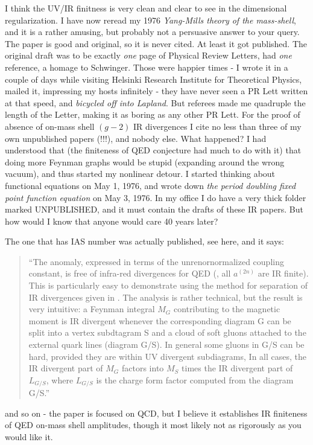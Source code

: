 \begin{description}
I think the UV/IR finitness is very clean and clear to see in the
dimensional regularization.
I have now reread my 1976 {\em {Yang-Mills} theory of the
mass-shell}, and it is a rather amusing, but probably not a
persuasive answer to your query. The paper is good and original, so it is
never cited. At least it got published. The original draft was to be
exactly \emph{one} page of Physical Review Letters, {had} \emph{one}
reference, a homage to Schwinger. Those were happier
times - I wrote it in a couple of days while visiting Helsinki Research
Institute for Theoretical Physics, mailed it, impressing my hosts
infinitely - they have never seen a PR Lett written at that speed, and
{\em bicycled off into Lapland}. But referees made me quadruple the
length of the Letter, making it as boring as any other PR Lett. For the
proof of absence of on-mass shell $(g-2)$ IR divergences I cite no less
than three of my own unpublished papers (!!!), and nobody else.
What
happened? I had understood that (the finiteness of QED
conjecture had much to do with it) that doing more Feynman graphs would
be stupid (expanding around the wrong vacuum), and thus started my
nonlinear detour. I started thinking about functional equations on May 1,
1976, and wrote down
{\em the period doubling fixed point function equation} on May 3, 1976.
In my office I do have a very thick folder marked UNPUBLISHED, and it
must contain the drafts of these IR papers. But how would I know that
anyone would care 40 years later?

The one that has IAS number was actually published, see
{here}, and it says:
\begin{quote}
``The anomaly, expressed in terms of the unrenornormalized coupling
constant, is free of infra-red divergences for QED (\ie, all $a^{(2n)}$
are IR finite). This is particularly easy to demonstrate using the method
for separation of IR divergences given in . The
analysis is rather technical, but the result is very intuitive: a Feynman
integral $M_G$ contributing to the magnetic moment is IR divergent
whenever the corresponding diagram G can be split into a vertex
subdtagram S and a cloud of soft gluons attached to the external quark
lines (diagram G/S). In general some gluons in G/S can be hard, provided
they are within UV divergent subdiagrams, In all cases, the IR divergent
part of $M_G$ factors into $M_S$ times the IR divergent part of
$L_{G/S}$, where $L_{G/S}$ is the charge form factor computed from the
diagram G/S.''
\end{quote}
and so on - the paper is focused on QCD, but I believe it establishes IR
finiteness of QED on-mass shell amplitudes, though it most likely not as
rigorously as you would like it.


\end{description}
